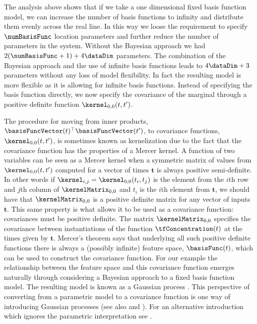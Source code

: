 \documentclass{article}
\begin{document}
The analysis above shows that if we take a one dimensional fixed
basis function model, we can increase the number of basis functions to
infinity and distribute them evenly across the real line. In this way
we loose the requirement to specify $\numBasisFunc$ location
parameters and further reduce the number of parameters in the
system. Without the Bayesian approach we had $2(\numBasisFunc +1) +
4\dataDim$ parameters. The combination of the Bayesian approach and
the use of infinite basis functions leads to $4\dataDim + 3$
parameters without any loss of model flexibility. In fact the resulting
model is more flexible as it is allowing for infinite basis
functions. Instead of specifying the basis function directly, we now
specify the covariance of the marginal through a positive definite
function $\kernel_{0,0}(t, t^\prime)$.

The procedure for moving from inner products,
$\basisFuncVector(t)^\top\basisFuncVector(t^\prime)$, to covariance functions,
$\kernel_{0,0}(t, t^\prime)$, is sometimes known as kernelization
\citep{Scholkopf:learning01} due to the fact that the covariance
function has the properties of a Mercer kernel. A function of two variables can be seen as a Mercer kernel when a
symmetric matrix of values from $\kernel_{0,0}(t, t^\prime)$ computed
for a vector of times $\mathbf{t}$ is always positive
semi-definite. In other words if $\kernel_{i,j} = \kernel_{0,0}(t_i,
t_j)$ is the element from the $i$th row and $j$th column of
$\kernelMatrix_{0,0}$ and $t_i$ is the $i$th element from $\mathbf{t}$, we
should have that $\kernelMatrix_{0,0}$ is a positive definite matrix for any
vector of inputs $\mathbf{t}$. This same property is what allows it to
be used as a covariance function: covariances must be positive
definite. The matrix $\kernelMatrix_{0,0}$ specifies the covariance between
instantiations of the function $\tfConcentration(t)$ at the times
given by $\mathbf{t}$. Mercer's theorem says that underlying all such
positive definite functions there is always a (possibly infinite)
feature space, $\basisFunc(t)$, which can be used to construct the
covariance function. For our example the relationship between the
feature space and this covariance function emerges naturally through
considering a Bayesian approach to a fixed basis function model. The
resulting model is known as a Gaussian process
\citep{Ohagan:curve78}. This perspective of converting from a
parametric model to a covariance function is one way of introducing
Gaussian processes (see also \citet{Williams:Gaussian95} and
\citet{Rasmussen:book06}). For an alternative introduction which
ignores the parametric interpretation see
\citet{Lawrence:licsbgp10}. 
\end{document}
